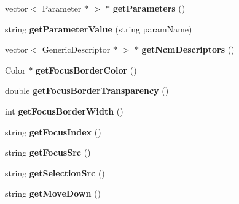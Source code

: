 \begin{CompactItemize}
\item 
vector$<$ Parameter $\ast$ $>$ $\ast$ \textbf{getParameters} ()\label{classbr_1_1pucrio_1_1telemidia_1_1ginga_1_1ncl_1_1model_1_1presentation_1_1CascadingDescriptor_94619ceff6000296997c7207a66769ee}

\item 
string \textbf{getParameterValue} (string paramName)\label{classbr_1_1pucrio_1_1telemidia_1_1ginga_1_1ncl_1_1model_1_1presentation_1_1CascadingDescriptor_e11fd941d5f42fabe6e1cca69588ad05}

\item 
vector$<$ GenericDescriptor $\ast$ $>$ $\ast$ \textbf{getNcmDescriptors} ()\label{classbr_1_1pucrio_1_1telemidia_1_1ginga_1_1ncl_1_1model_1_1presentation_1_1CascadingDescriptor_9b19670db00f8af3a69469cdce6422ed}

\item 
Color $\ast$ \textbf{getFocusBorderColor} ()\label{classbr_1_1pucrio_1_1telemidia_1_1ginga_1_1ncl_1_1model_1_1presentation_1_1CascadingDescriptor_20292d0b52d052cbb6846f129a4ed585}

\item 
double \textbf{getFocusBorderTransparency} ()\label{classbr_1_1pucrio_1_1telemidia_1_1ginga_1_1ncl_1_1model_1_1presentation_1_1CascadingDescriptor_467bf38f6dc70610c0bdc58276bb7fc8}

\item 
int \textbf{getFocusBorderWidth} ()\label{classbr_1_1pucrio_1_1telemidia_1_1ginga_1_1ncl_1_1model_1_1presentation_1_1CascadingDescriptor_85add9793bf1db7dce3ebefe4998d124}

\item 
string \textbf{getFocusIndex} ()\label{classbr_1_1pucrio_1_1telemidia_1_1ginga_1_1ncl_1_1model_1_1presentation_1_1CascadingDescriptor_bb02007af3c039562d3352ff94e8decf}

\item 
string \textbf{getFocusSrc} ()\label{classbr_1_1pucrio_1_1telemidia_1_1ginga_1_1ncl_1_1model_1_1presentation_1_1CascadingDescriptor_ef28331b70ca4876e33bfe70fa6385e3}

\item 
string \textbf{getSelectionSrc} ()\label{classbr_1_1pucrio_1_1telemidia_1_1ginga_1_1ncl_1_1model_1_1presentation_1_1CascadingDescriptor_8334fde557695777c56aa70da7695334}

\item 
string \textbf{getMoveDown} ()\label{classbr_1_1pucrio_1_1telemidia_1_1ginga_1_1ncl_1_1model_1_1presentation_1_1CascadingDescriptor_46cdd70420492178937a646caac14943}


\end{CompactItemize}
